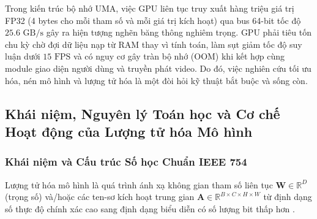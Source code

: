 \documentclass[11pt,a4paper]{article}
\begin{document}
Trong kiến trúc bộ nhớ UMA, việc GPU liên tục truy xuất hàng triệu giá trị FP32 (4 bytes cho mỗi tham số và mỗi giá trị kích hoạt) qua bus 64-bit tốc độ $25.6\text{ GB/s}$ gây ra hiện tượng nghẽn băng thông nghiêm trọng. GPU phải tiêu tốn chu kỳ chờ đợi dữ liệu nạp từ RAM thay vì tính toán, làm sụt giảm tốc độ suy luận dưới $15\text{ FPS}$ và có nguy cơ gây tràn bộ nhớ (OOM) khi kết hợp cùng module giao diện người dùng và truyền phát video. Do đó, việc nghiên cứu tối ưu hóa, nén mô hình và lượng tử hóa là một đòi hỏi kỹ thuật bắt buộc và sống còn.

\subsection{Khái niệm, Nguyên lý Toán học và Cơ chế Hoạt động của Lượng tử hóa Mô hình}
\label{subsec:quantization_theory}

\subsubsection{Khái niệm và Cấu trúc Số học Chuẩn IEEE 754}
Lượng tử hóa mô hình là quá trình ánh xạ không gian tham số liên tục $\mathbf{W} \in \mathbb{R}^{D}$ (trọng số) và/hoặc các ten-sơ kích hoạt trung gian $\mathbf{A} \in \mathbb{R}^{B \times C \times H \times W}$ từ định dạng số thực độ chính xác cao sang định dạng biểu diễn có số lượng bit thấp hơn \cite{jacob2018quantization, micikevicius2018mixed}.
\end{document}
